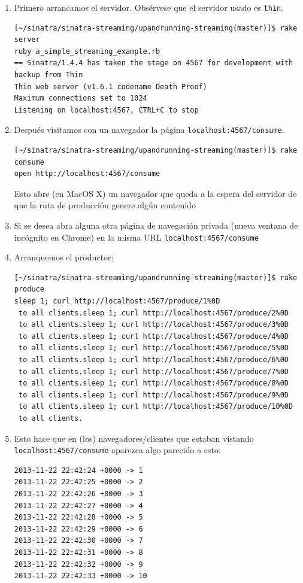 \begin{enumerate}
\item 
Primero arrancamos el servidor. Obsérvese que el servidor usado es \verb|thin|.
\begin{verbatim}
[~/sinatra/sinatra-streaming/upandrunning-streaming(master)]$ rake server
ruby a_simple_streaming_example.rb
== Sinatra/1.4.4 has taken the stage on 4567 for development with backup from Thin
Thin web server (v1.6.1 codename Death Proof)
Maximum connections set to 1024
Listening on localhost:4567, CTRL+C to stop
\end{verbatim}
\item 
Después visitamos con un navegador la página 
\verb|localhost:4567/consume|. 
\begin{verbatim}
[~/sinatra/sinatra-streaming/upandrunning-streaming(master)]$ rake consume
open http://localhost:4567/consume
\end{verbatim}
Esto abre (en MacOS X) un navegador que queda a la espera del
servidor de que la ruta de producción genere algún contenido
\item 
Si se desea abra alguna otra página de navegación privada (nueva ventana de incógnito en Chrome)
en la misma URL \verb|localhost:4567/consume|
\item 
Arranquemos el productor:
\begin{verbatim}
[~/sinatra/sinatra-streaming/upandrunning-streaming(master)]$ rake produce
sleep 1; curl http://localhost:4567/produce/1%0D
 to all clients.sleep 1; curl http://localhost:4567/produce/2%0D
 to all clients.sleep 1; curl http://localhost:4567/produce/3%0D
 to all clients.sleep 1; curl http://localhost:4567/produce/4%0D
 to all clients.sleep 1; curl http://localhost:4567/produce/5%0D
 to all clients.sleep 1; curl http://localhost:4567/produce/6%0D
 to all clients.sleep 1; curl http://localhost:4567/produce/7%0D
 to all clients.sleep 1; curl http://localhost:4567/produce/8%0D
 to all clients.sleep 1; curl http://localhost:4567/produce/9%0D
 to all clients.sleep 1; curl http://localhost:4567/produce/10%0D
 to all clients.
\end{verbatim}
\item 
Esto hace que en (los) navegadores/clientes que estaban 
vistando  \verb|localhost:4567/consume| aparezca algo parecido a esto:
\begin{verbatim}
2013-11-22 22:42:24 +0000 -> 1
2013-11-22 22:42:25 +0000 -> 2
2013-11-22 22:42:26 +0000 -> 3
2013-11-22 22:42:27 +0000 -> 4
2013-11-22 22:42:28 +0000 -> 5
2013-11-22 22:42:29 +0000 -> 6
2013-11-22 22:42:30 +0000 -> 7
2013-11-22 22:42:31 +0000 -> 8
2013-11-22 22:42:32 +0000 -> 9
2013-11-22 22:42:33 +0000 -> 10
\end{verbatim}
\end{enumerate}

